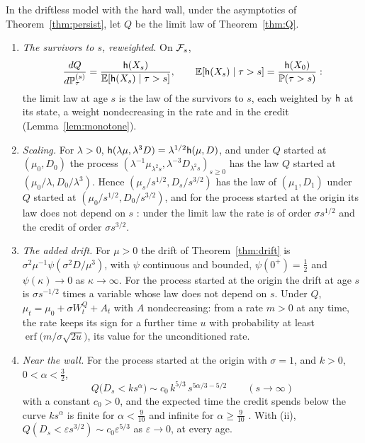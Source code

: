 \begin{proposition}\label{prop:limitage}
In the driftless model with the hard wall, under the asymptotics of
Theorem~\ref{thm:persist}, let $Q$ be the limit law of
Theorem~\ref{thm:Q}.
\begin{enumerate}[label=\emph{(\roman*)},itemsep=1pt]
\item \emph{The survivors to $s$, reweighted.} On $\mathcal{F}_s$,
\begin{equation}\label{eq:limitage}
\frac{dQ}{d\mathbb{P}^{(s)}_\tau}=\frac{\mathsf{h}(X_s)}{\mathbb{E}[\mathsf{h}(X_s)\mid\tau>s]},
\qquad
\mathbb{E}[\mathsf{h}(X_s)\mid\tau>s]=\frac{\mathsf{h}(X_0)}{\mathbb{P}(\tau>s)}:
\end{equation}
the limit law at age $s$ is the law of the survivors to $s$, each
weighted by $\mathsf{h}$ at its state, a weight nondecreasing in the rate and in
the credit (Lemma~\ref{lem:monotone}).
\item \emph{Scaling.} For $\lambda>0$,
$\mathsf{h}(\lambda\mu,\lambda^3D)=\lambda^{1/2}\mathsf{h}(\mu,D)$, and under $Q$
started at $(\mu_0,D_0)$ the process
$(\lambda^{-1}\mu_{\lambda^2s},\lambda^{-3}D_{\lambda^2s})_{s\ge0}$ has the
law $Q$ started at $(\mu_0/\lambda,D_0/\lambda^3)$. Hence
$(\mu_s/s^{1/2},D_s/s^{3/2})$ has the law of $(\mu_1,D_1)$ under $Q$
started at $(\mu_0/s^{1/2},D_0/s^{3/2})$, and for the process started at
the origin its law does not depend on $s$ \cite{GJW99}: under the limit
law the rate is of order $\sigma s^{1/2}$ and the credit of order
$\sigma s^{3/2}$.
\item \emph{The added drift.} For $\mu>0$ the drift of
Theorem~\ref{thm:drift} is $\sigma^2\mu^{-1}\psi(\sigma^2D/\mu^3)$, with
$\psi$ continuous and bounded, $\psi(0^+)=\tfrac12$ and
$\psi(\kappa)\to0$ as $\kappa\to\infty$. For the process started at the
origin the drift at age $s$ is $\sigma s^{-1/2}$ times a variable whose
law does not depend on $s$. Under $Q$, $\mu_t=\mu_0+\sigma W^Q_t+A_t$ with
$A$ nondecreasing: from a rate $m>0$ at any time, the rate keeps its sign
for a further time $u$ with probability at least
$\operatorname{erf}\bigl(m/\sigma\sqrt{2u}\bigr)$, its value for the
unconditioned rate.
\item \emph{Near the wall.} For the process started at the origin with
$\sigma=1$, and $k>0$, $0<\alpha<\tfrac32$,
\begin{equation}\label{eq:nearwall}
Q\bigl(D_s<ks^{\alpha}\bigr)\sim c_0\,k^{5/3}\,s^{5\alpha/3-5/2}
\qquad(s\to\infty)
\end{equation}
with a constant $c_0>0$, and the expected time the credit spends below
the curve $ks^{\alpha}$ is finite for $\alpha<\tfrac9{10}$ and infinite
for $\alpha\ge\tfrac9{10}$ \cite{GJW99}. With (ii),
$Q(D_s<\varepsilon s^{3/2})\sim c_0\varepsilon^{5/3}$ as
$\varepsilon\to0$, at every age.
\end{enumerate}
\end{proposition}

